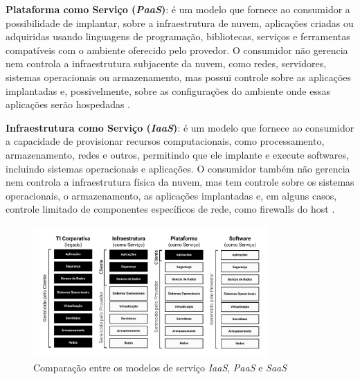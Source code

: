 \textbf{Plataforma como Serviço (\textit{PaaS})}: é um modelo que fornece ao consumidor a possibilidade de implantar, sobre a infraestrutura de nuvem, aplicações criadas ou adquiridas usando linguagens de programação, bibliotecas, serviços e ferramentas compatíveis com o ambiente oferecido pelo provedor. O consumidor não gerencia nem controla a infraestrutura subjacente da nuvem, como redes, servidores, sistemas operacionais ou armazenamento, mas possui controle sobre as aplicações implantadas e, possivelmente, sobre as configurações do ambiente onde essas aplicações serão hospedadas \cite{mell2011}.

\textbf{Infraestrutura como Serviço (\textit{IaaS})}: é um modelo que fornece ao consumidor a capacidade de provisionar recursos computacionais, como processamento, armazenamento, redes e outros, permitindo que ele implante e execute softwares, incluindo sistemas operacionais e aplicações. O consumidor também não gerencia nem controla a infraestrutura física da nuvem, mas tem controle sobre os sistemas operacionais, o armazenamento, as aplicações implantadas e, em alguns casos, controle limitado de componentes específicos de rede, como firewalls do host \cite{mell2011}.

\begin{figure}[htb]
    \centering
    \includegraphics[width=0.8\textwidth]{figuras/Figura 1 - Comparação entre os modelos de serviço.png}
    \caption{Comparação entre os modelos de serviço \textit{IaaS}, \textit{PaaS} e \textit{SaaS}}
    \label{fig:comparacao-modelos-servico}
\end{figure}

